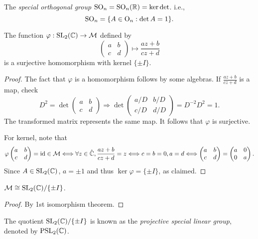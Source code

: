 \documentclass[10pt]{article}
\begin{document}
    \begin{definition}
        The \textit{special orthogonal group} $ \mathrm{SO}_n=\mathrm{SO}_n({\mathbb{R}}) = \ker \det $. i.e.,
        \[
            \mathrm{SO}_n=\{A\in \mathrm{O}_n:\det A=1\}.
        \]
    \end{definition}
    \begin{proposition}\label{prop:7.6}
        The function $ \varphi:\mathrm{SL}_2({\mathbb{C}})\to {\mathcal{M}} $ defined by 
        \[
            \begin{pmatrix}
                a&b\\
                c&d
            \end{pmatrix} \mapsto \frac{az+b}{cz+d}
        \]
        is a surjective homomorphism with kernel $ \{\pm I\} $.
    \end{proposition}
    \begin{proof}
        The fact that $ \varphi $ is a homomorphism follows by some algebras. If $ \frac{az+b}{cz+d} $ is a \mobius map, check
        \[
            D^2=\det \begin{pmatrix}
                a&b\\
                c&d
            \end{pmatrix} \Longrightarrow \det \begin{pmatrix}
                a/D&b/D\\
                c/D&d/D
            \end{pmatrix}=D^{-2}D^2=1.
        \]
        The transformed matrix represents the same \mobius map. It follows that $ \varphi $ is surjective.

        For kernel, note that 
        \[
            \varphi\begin{pmatrix}
                a&b\\
                c&d
            \end{pmatrix}=\operatorname{id}\in {\mathcal{M}} \Longleftrightarrow \forall z\in \hat{{\mathbb{C}}},\frac{az+b}{cz+d}=z \Longleftrightarrow c=b=0,a=d \Longleftrightarrow \begin{pmatrix}
                a&b\\
                c&d
            \end{pmatrix}=\begin{pmatrix}
                a&0\\
                0&a
            \end{pmatrix}.
        \]
        Since $ A\in \mathrm{SL}_2({\mathbb{C}}) $, $a=\pm 1$ and thus $ \ker \varphi=\{\pm I\} $, as claimed. 
    \end{proof}
    \begin{corollary}\label{col:7.7}
            $ {\mathcal{M}} \cong \mathrm{SL}_2({\mathbb{C}})/\{\pm I\} $.
    \end{corollary}
    \begin{proof}
        By 1st isomorphism theorem.
    \end{proof}
    \begin{remark}
        The quotient $\mathrm{SL}_2({\mathbb{C}})/\{\pm I\}$ is known as the \textit{projective special linear group}, denoted by $ \mathrm{PSL}_2({\mathbb{C}}) $.
    \end{remark}
\end{document}
